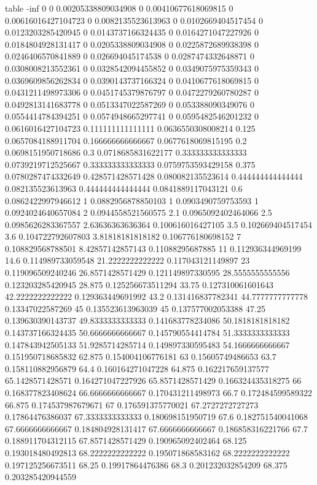 table {%
-inf 0
0 0.00205338809034908
0 0.00410677618069815
0 0.00616016427104723
0 0.0082135523613963
0 0.0102669404517454
0 0.0123203285420945
0 0.0143737166324435
0 0.0164271047227926
0 0.0184804928131417
0 0.0205338809034908
0 0.0225872689938398
0 0.0246406570841889
0 0.026694045174538
0 0.0287474332648871
0 0.0308008213552361
0 0.0328542094455852
0 0.0349075975359343
0 0.0369609856262834
0 0.0390143737166324
0 0.0410677618069815
0 0.0431211498973306
0 0.0451745379876797
0 0.0472279260780287
0 0.0492813141683778
0 0.0513347022587269
0 0.053388090349076
0 0.0554414784394251
0 0.0574948665297741
0 0.0595482546201232
0 0.0616016427104723
0.111111111111111 0.0636550308008214
0.125 0.0657084188911704
0.166666666666667 0.0677618069815195
0.2 0.0698151950718686
0.3 0.0718685831622177
0.333333333333333 0.0739219712525667
0.333333333333333 0.0759753593429158
0.375 0.0780287474332649
0.428571428571428 0.080082135523614
0.444444444444444 0.082135523613963
0.444444444444444 0.0841889117043121
0.6 0.0862422997946612
1 0.0882956878850103
1 0.0903490759753593
1 0.0924024640657084
2 0.0944558521560575
2.1 0.0965092402464066
2.5 0.0985626283367557
2.63636363636364 0.100616016427105
3.5 0.102669404517454
3.6 0.104722792607803
3.81818181818182 0.106776180698152
7 0.108829568788501
8.42857142857143 0.11088295687885
11 0.112936344969199
14.6 0.114989733059548
21.2222222222222 0.117043121149897
23 0.119096509240246
26.8571428571429 0.121149897330595
28.5555555555556 0.123203285420945
28.875 0.125256673511294
33.75 0.127310061601643
42.2222222222222 0.129363449691992
43.2 0.131416837782341
44.7777777777778 0.13347022587269
45 0.135523613963039
45 0.137577002053388
47.25 0.139630390143737
49.8333333333333 0.141683778234086
50.1818181818182 0.143737166324435
50.6666666666667 0.145790554414784
51.3333333333333 0.147843942505133
51.9285714285714 0.149897330595483
54.1666666666667 0.151950718685832
62.875 0.154004106776181
63 0.15605749486653
63.7 0.158110882956879
64.4 0.160164271047228
64.875 0.162217659137577
65.1428571428571 0.164271047227926
65.8571428571429 0.166324435318275
66 0.168377823408624
66.6666666666667 0.170431211498973
66.7 0.172484599589322
66.875 0.174537987679671
67 0.176591375770021
67.2727272727273 0.17864476386037
67.3333333333333 0.180698151950719
67.6 0.182751540041068
67.6666666666667 0.184804928131417
67.6666666666667 0.186858316221766
67.7 0.188911704312115
67.8571428571429 0.190965092402464
68.125 0.193018480492813
68.2222222222222 0.195071868583162
68.2222222222222 0.197125256673511
68.25 0.19917864476386
68.3 0.201232032854209
68.375 0.203285420944559
}
